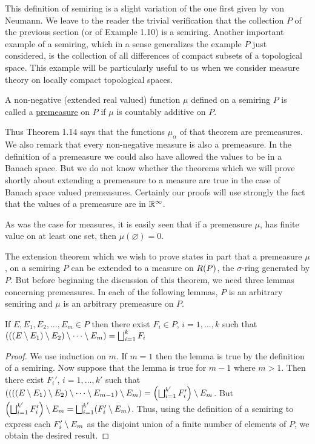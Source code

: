 This definition of semiring is a slight variation of the one first given by von Neumann. We leave to the reader the trivial verification that the collection $P$ of the previous section (or of Example 1.10) is a semiring. Another important example of a semiring, which in a sense generalizes the example $P$ just considered, is the collection of all differences of compact subsets of a topological space. This example will be particularly useful to us when we consider measure theory on locally compact topological spaces.

\begin{definition}
A non-negative (extended real valued) function $\mu$ defined on a semiring $P$ is called a \underline{premeasure} on $P$ if $\mu$ is countably additive on $P$.
\end{definition}

Thus Theorem 1.14 says that the functions $\mu_\alpha$ of that theorem are premeasures. We also remark that every non-negative measure is also a premeasure. In the definition of a premeasure we could also have allowed the values to be in a Banach space. But we do not know whether the theorems which we will prove shortly about extending a premeasure to a measure are true in the case of Banach space valued premeasures. Certainly our proofs will use strongly the fact that the values of a premeasure are in $\mathbb{R}^\infty$.

As was the case for measures, it is easily seen that if a premeasure $\mu$, has finite value on at least one set, then $\mu(\varnothing)=0$.

The extension theorem which we wish to prove states in part that a premeasure $\mu$, on a semiring $P$ can be extended to a measure on $R(P)$, the $\sigma$-ring generated by $P$. But before beginning the discussion of this theorem, we need three lemmas concerning premeasures. In each of the following lemmas, $P$ is an arbitrary semiring and $\mu$ is an arbitrary premeasure on $P$.

\begin{lemma}
If $E, E_1, E_2, \dots, E_m\in P$ then there exist $F_i \in P$, $i=1, \dots, k$ such that $(((E\setminus E_1)\setminus E_2)\setminus \cdots\setminus E_m)=\bigsqcup_{i=1}^k F_i$ 
\end{lemma}
\begin{proof}
We use induction on $m$. If $m=1$ then the lemma is true by the definition of a semiring. Now suppose that the lemma is true for $m-1$ where $m>1$. Then there exist $F_i'$, $i=1, \dots, k'$ such that $((((E\setminus E_1)\setminus E_2)\setminus\cdots\setminus E_{m-1})\setminus E_m)=\left(\bigsqcup_{i=1}^{k'}F_i'\right)\setminus E_m$. But $\left(\bigsqcup_{i=1}^{k'}F_i'\right)\setminus E_m=\bigsqcup_{i=1}^{k'}(F_i'\setminus E_m)$. Thus, using the definition of a semiring to express each $F_i'\setminus E_m$ as the disjoint union of a finite number of elements of $P$, we obtain the desired result.
\end{proof}

